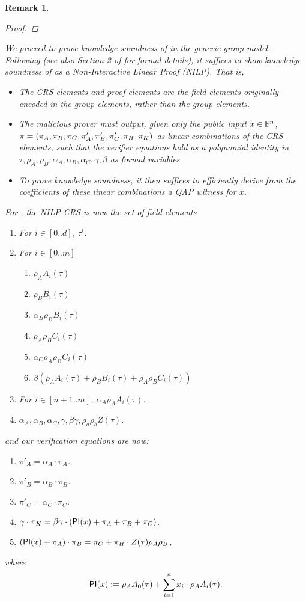 \documentclass[11pt]{article}
\numberwithin{figure}{section} %
\newtheorem{remark}[thm]{Remark}
\begin{document}
\begin{remark}
\begin{proof}
\end{proof}


We proceed to prove knowledge soundness of \bctvprime in the generic group model.
Following \cite{groth16} (see also Section 2 of \cite{BG18} for formal details), it suffices to show knowledge
soundness of \bctvprime as a Non-Interactive Linear Proof (NILP). That is, 
\begin{itemize}
\item The CRS elements and proof elements are the field elements originally encoded in the group elements, rather than the group elements.
\item The malicious prover must output, given only the public input $x\in\mathbb F^n$, $\pi = (\pi_A,\pi_B,\pi_C,\pi'_A,\pi'_B,\pi'_C,\pi_H,\pi_K)$ as linear combinations of the CRS elements, such that the verifier equations hold as a polynomial identity in 
$\tau,\rho_A,\rho_B,\alpha_A,\alpha_B,\alpha_C,\gamma,\beta$ as formal variables.
\item To prove knowledge soundness, it then suffices to efficiently derive from the coefficients of these linear combinations a QAP witness for $x$.
\end{itemize}

For \bctvprime, the NILP CRS is now the set of \emph{field elements}

\begin{enumerate}
 \item For $i\in [0..d]$, $\tau^i$.
 \item For $i\in [0..m]$ 
 
 \begin{enumerate}
  \item $\rho_A A_i(\tau)$
\item $\rho_B B_i(\tau)$
\item $\alpha_B\rho_B B_i(\tau)$
\item $\rho_A\rho_B C_i(\tau)$
\item $\alpha_C \rho_A\rho_B C_i(\tau)$ 
\item $\beta(\rho_A A_i(\tau) + \rho_B B_i(\tau) + \rho_A\rho_B C_i(\tau))$ 
\end{enumerate}
\item For $i\in [n+1..m]$, $\alpha_A\rho_A A_i(\tau)$.

\item $\alpha_A,\alpha_B,\alpha_C,\gamma,\beta\gamma,\rho_a\rho_b Z(\tau)$.
\end{enumerate}

and our verification equations are now:
\begin{enumerate}
 \item $\pi'_A= \alpha_A\cdot \pi_A$.
\item $\pi'_B=\alpha_B\cdot \pi_B$.
\item $\pi'_C=\alpha_C\cdot \pi_C$.
\item $\gamma\cdot \pi_K =\beta\gamma\cdot (\mathsf{PI}(x)+\pi_A+\pi_B+\pi_C)$.
\item $(\mathsf{PI}(x)+\pi_A)\cdot \pi_B= \pi_C + \pi_H\cdot Z(\tau)\rho_A\rho_B$,
 \end{enumerate}
where
\[\mathsf{PI}(x):= \rho_A A_0(\tau) + \sum_{i=1}^n x_i\cdot \rho_A A_i(\tau) .\]
 

\end{remark}
\end{document}
